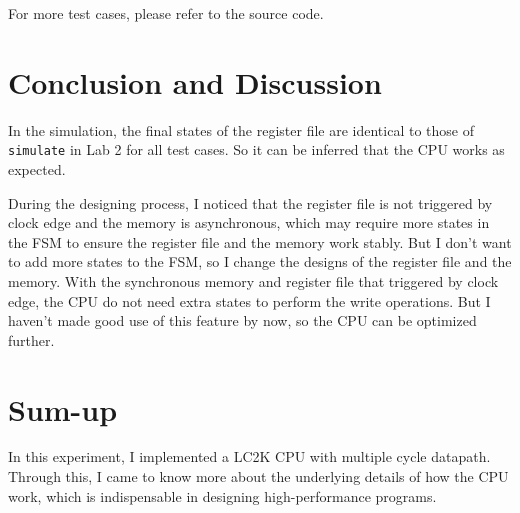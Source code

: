 \documentclass[a4paper]{article}
\begin{document}
For more test cases, please refer to the source code.

\section{Conclusion and Discussion}

In the simulation, the final states of the register file are identical to those of \verb|simulate| in Lab 2 for all test cases.
So it can be inferred that the CPU works as expected.

During the designing process, I noticed that the register file is not triggered by clock edge and the memory is asynchronous,
which may require more states in the FSM to ensure the register file and the memory work stably. But I don't want to add more
states to the FSM, so I change the designs of the register file and the memory. With the synchronous memory and register file
that triggered by clock edge, the CPU do not need extra states to perform the write operations. But I haven't made good use
of this feature by now, so the CPU can be optimized further.

\section{Sum-up}
In this experiment, I implemented a LC2K CPU with multiple cycle datapath. Through this, I came to know more about the
underlying details of how the CPU work, which is indispensable in designing high-performance programs.
\end{document}
